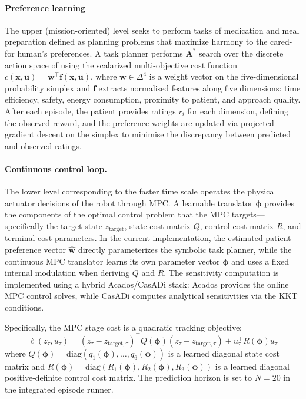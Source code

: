 \documentclass{article}
\begin{document}
\paragraph{Preference learning}
The upper (mission-oriented) level seeks to perform tasks of medication and meal preparation defined as planning problems that maximize harmony to the cared-for human's preferences. A task planner performs $\mathbf{A^*}$ search over the discrete action space of using the scalarized multi-objective cost function $c(\mathbf{x}, \mathbf{u}) = \mathbf{w}^\top \mathbf{f}(\mathbf{x}, \mathbf{u})$, where $\mathbf{w} \in \Delta^4$ is a weight vector on the five-dimensional probability simplex and $\mathbf{f}$ extracts normalised features along five dimensions: time efficiency, safety, energy consumption, proximity to patient, and approach quality. After each episode, the patient provides ratings $r_i$ for each dimension, defining the observed reward, and the preference weights are updated via projected gradient descent on the simplex to minimise the discrepancy between predicted and observed ratings.
\paragraph{Continuous control loop.}
The lower level corresponding to the faster time scale operates the physical actuator decisions of the robot through MPC. A learnable translator $\boldsymbol{\phi}$ provides the components of the optimal control problem that the MPC targets---specifically the target state $z_{\text{target}}$, state cost matrix $Q$, control cost matrix $R$, and terminal cost parameters. In the current implementation, the estimated patient-preference vector $\hat{\mathbf{w}}$ directly parameterizes the symbolic task planner, while the continuous MPC translator learns its own parameter vector $\boldsymbol{\phi}$ and uses a fixed internal modulation when deriving $Q$ and $R$. The sensitivity computation is implemented using a hybrid Acados/CasADi stack: Acados provides the online MPC control solves, while CasADi computes analytical sensitivities via the KKT conditions.



Specifically, the MPC stage cost is a quadratic tracking objective:
\begin{equation}
    \ell(z_{\tau}, u_{\tau}) = (z_{\tau} - z_{\text{target},\tau})^\top 
    Q(\boldsymbol{\phi})(z_{\tau} - z_{\text{target},\tau}) + 
    u_{\tau}^\top R(\boldsymbol{\phi}) u_{\tau}
    \label{eq:mpc_stage_cost}
\end{equation}
where $Q(\boldsymbol{\phi}) = \text{diag}(q_1(\boldsymbol{\phi}), \ldots, 
q_6(\boldsymbol{\phi}))$ is a learned diagonal state cost matrix and 
$R(\boldsymbol{\phi}) = \text{diag}(R_1(\boldsymbol{\phi}), R_2(\boldsymbol{\phi}), 
R_3(\boldsymbol{\phi}))$ is a learned diagonal positive-definite control 
cost matrix. The prediction horizon is set to $N=20$ in the integrated episode runner.
\end{document}
